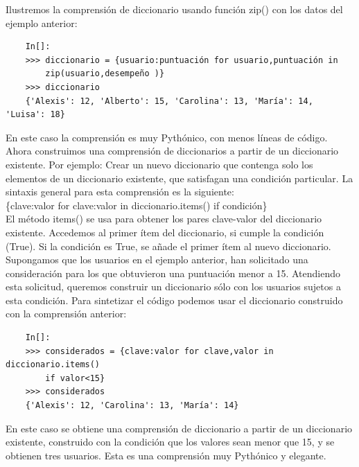 Ilustremos la comprensión de diccionario usando función  {\ttfamily zip()} con los datos del ejemplo anterior:

\begin{lstlisting}
	In[]:	
	>>> diccionario = {usuario:puntuación for usuario,puntuación in  
		zip(usuario,desempeño )}
	>>> diccionario
	{'Alexis': 12, 'Alberto': 15, 'Carolina': 13, 'María': 14, 'Luisa': 18} 
\end{lstlisting}	

En este caso la comprensión es muy Pythónico, con menos líneas de código. \\

Ahora construimos una comprensión de diccionarios a partir de un diccionario existente.
Por ejemplo: Crear un nuevo diccionario que contenga solo los elementos de un diccionario existente, que satisfagan una condición particular. La sintaxis general para esta comprensión es la siguiente:\\

{\ttfamily \{}clave:valor {\ttfamily  for}  clave:valor {\ttfamily in diccionario.items() if} condición{\ttfamily \}}\\

El método {\ttfamily items()} se usa para obtener los pares clave-valor del diccionario existente. Accedemos al primer ítem del diccionario, si cumple la condición ({\ttfamily True}).
Si la condición es True, se añade el primer ítem al nuevo  diccionario.\\

Supongamos que los usuarios en el ejemplo anterior, han solicitado una consideración para los que obtuvieron una puntuación menor a 15. Atendiendo esta solicitud, queremos construir un diccionario sólo con los usuarios sujetos a esta condición. Para sintetizar el código podemos  usar el diccionario construido con la comprensión anterior: 

\begin{lstlisting}
	In[]:	
	>>> considerados = {clave:valor for clave,valor in diccionario.items()
		if valor<15}
	>>> considerados
	{'Alexis': 12, 'Carolina': 13, 'María': 14}
\end{lstlisting}

En este caso se obtiene una comprensión de diccionario a partir de un diccionario existente, construido con la condición que los valores sean menor que 15, y se obtienen tres usuarios. Esta es una comprensión muy Pythónico y elegante. 






